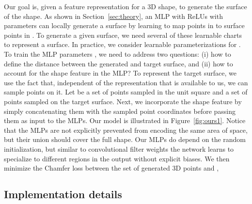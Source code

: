 \documentclass[10pt,twocolumn,letterpaper]{article}
\begin{document}
Our goal is, given a feature representation  for a 3D shape, to generate the surface of the shape. 
As shown in Section~\ref{sec:theory}, an MLP with ReLUs  with parameters  can locally generate a surface by learning to map points in  to surface points in . To generate a given surface, we need several of these learnable charts to represent a surface. In practice, we consider  learnable parameterizations  for .
To train the MLP parameters , we need to address two questions: (i) how to define the distance between the generated and target surface, and (ii) how to account for the shape feature  in the MLP?
To represent the target surface, we use the fact that, independent of the representation that is available to us, we can sample points on it. Let  be a set of points sampled in the unit square  and   a set of points sampled on the target surface.
Next, we incorporate the shape feature  by simply concatenating them with the sampled point coordinates  before passing them as input to the MLPs. 
Our model is illustrated in Figure~\ref{fig:ours1}. Notice that the MLPs are not explicitly prevented from encoding the same area of space, but their union should cover the full shape. Our MLPs do depend on the random initialization, but similar to convolutional filter weights the network learns to specialize to different regions in the output without explicit biases.
We then minimize the Chamfer loss between the set of generated 3D points and ,












\subsection{Implementation details}
\end{document}
